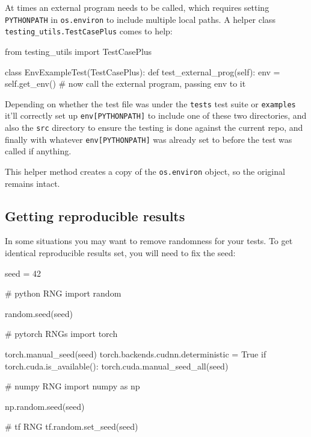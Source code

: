 \documentclass[
]{report}
\newenvironment{Shaded}{\begin{snugshade}}{\end{snugshade}}
\newcommand{\CommentTok}[1]{\textcolor[rgb]{0.37,0.37,0.37}{#1}}
\newcommand{\ControlFlowTok}[1]{\textcolor[rgb]{0.00,0.23,0.31}{#1}}
\newcommand{\DecValTok}[1]{\textcolor[rgb]{0.68,0.00,0.00}{#1}}
\newcommand{\ImportTok}[1]{\textcolor[rgb]{0.00,0.46,0.62}{#1}}
\newcommand{\KeywordTok}[1]{\textcolor[rgb]{0.00,0.23,0.31}{#1}}
\newcommand{\NormalTok}[1]{\textcolor[rgb]{0.00,0.23,0.31}{#1}}
\newcommand{\OperatorTok}[1]{\textcolor[rgb]{0.37,0.37,0.37}{#1}}
\newcommand{\VariableTok}[1]{\textcolor[rgb]{0.07,0.07,0.07}{#1}}
\begin{document}
At times an external program needs to be called, which requires setting
\texttt{PYTHONPATH} in \texttt{os.environ} to include multiple local
paths. A helper class \texttt{testing\_utils.TestCasePlus} comes to
help:

\begin{Shaded}
\begin{Highlighting}[]
\ImportTok{from}\NormalTok{ testing\_utils }\ImportTok{import}\NormalTok{ TestCasePlus}


\KeywordTok{class}\NormalTok{ EnvExampleTest(TestCasePlus):}
    \KeywordTok{def}\NormalTok{ test\_external\_prog(}\VariableTok{self}\NormalTok{):}
\NormalTok{        env }\OperatorTok{=} \VariableTok{self}\NormalTok{.get\_env()}
        \CommentTok{\# now call the external program, passing \textasciigrave{}env\textasciigrave{} to it}
\end{Highlighting}
\end{Shaded}

Depending on whether the test file was under the \texttt{tests} test
suite or \texttt{examples} it'll correctly set up
\texttt{env{[}PYTHONPATH{]}} to include one of these two directories,
and also the \texttt{src} directory to ensure the testing is done
against the current repo, and finally with whatever
\texttt{env{[}PYTHONPATH{]}} was already set to before the test was
called if anything.

This helper method creates a copy of the \texttt{os.environ} object, so
the original remains intact.

\subsection{Getting reproducible
results}\label{getting-reproducible-results}

In some situations you may want to remove randomness for your tests. To
get identical reproducible results set, you will need to fix the seed:

\begin{Shaded}
\begin{Highlighting}[]
\NormalTok{seed }\OperatorTok{=} \DecValTok{42}

\CommentTok{\# python RNG}
\ImportTok{import}\NormalTok{ random}

\NormalTok{random.seed(seed)}

\CommentTok{\# pytorch RNGs}
\ImportTok{import}\NormalTok{ torch}

\NormalTok{torch.manual\_seed(seed)}
\NormalTok{torch.backends.cudnn.deterministic }\OperatorTok{=} \VariableTok{True}
\ControlFlowTok{if}\NormalTok{ torch.cuda.is\_available():}
\NormalTok{    torch.cuda.manual\_seed\_all(seed)}

\CommentTok{\# numpy RNG}
\ImportTok{import}\NormalTok{ numpy }\ImportTok{as}\NormalTok{ np}

\NormalTok{np.random.seed(seed)}

\CommentTok{\# tf RNG}
\NormalTok{tf.random.set\_seed(seed)}
\end{Highlighting}
\end{Shaded}
\end{document}
